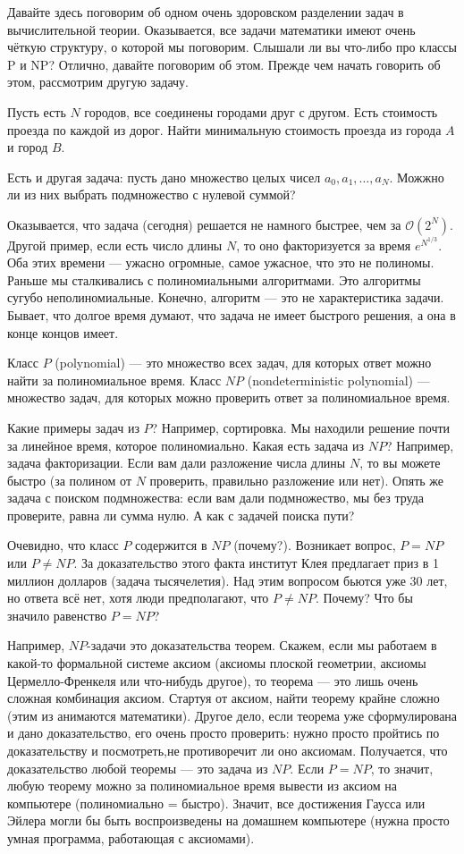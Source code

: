 \documentclass[12pt]{article}
\begin{document}
Давайте здесь поговорим об одном очень здоровском разделении задач в вычислительной теории. Оказывается, все задачи математики имеют очень чёткую структуру, о которой мы поговорим. Слышали ли вы что-либо про классы P и NP? Отлично, давайте поговорим об этом. Прежде чем начать говорить об этом, рассмотрим другую задачу.

Пусть есть $N$ городов, все соединены городами друг с другом. Есть стоимость проезда по каждой из дорог. Найти минимальную стоимость проезда из города $A$ и город $B$.

Есть и другая задача: пусть дано множество целых чисел $a_0, a_1, \ldots, a_N$. Можжно ли из них выбрать подмножество с нулевой суммой?

Оказывается, что задача (сегодня) решается не намного быстрее, чем за $\mathcal{O}(2^N)$. Другой пример, если есть число длины $N$, то оно факторизуется за время $e^{N^{1/3}}$. Оба этих времени --- ужасно огромные, самое ужасное, что это не полиномы. Раньше мы сталкивались с полиномиальными алгоритмами. Это алгоритмы сугубо неполиномиальные. Конечно, алгоритм --- это не характеристика задачи. Бывает, что долгое время думают, что задача не имеет быстрого решения, а она в конце концов имеет.

Класс $P$ (polynomial) --- это множество всех задач, для которых ответ можно найти за полиномиальное время. Класс $NP$ (nondeterministic polynomial) --- множество задач, для которых можно проверить ответ за полиномиальное время. 

Какие примеры задач из $P$? Например, сортировка. Мы находили решение почти за линейное время, которое полиномиально. Какая есть задача из $NP$? Например, задача факторизации. Если вам дали разложение числа длины $N$, то вы можете быстро (за полином от $N$ проверить, правильно разложение или нет). Опять же задача с поиском подмножества: если вам дали подмножество, мы без труда проверите, равна ли сумма нулю. А как с задачей поиска пути?

Очевидно, что класс $P$ содержится в $NP$ (почему?). Возникает вопрос, $P = NP$ или $P \neq NP$. За доказательство этого факта институт Клея предлагает приз в 1 миллион долларов (задача тысячелетия). Над этим вопросом бьются уже 30 лет, но ответа всё нет, хотя люди предполагают, что $P \neq NP$. Почему? Что бы значило равенство $P = NP$? 

Например, $NP$-задачи это доказательства теорем. Скажем, если мы работаем в какой-то формальной системе аксиом (аксиомы плоской геометрии, аксиомы Цермелло-Френкеля или что-нибудь другое), то теорема --- это лишь очень сложная комбинация аксиом. Стартуя от аксиом, найти теорему крайне сложно (этим из анимаются математики). Другое дело, если теорема уже сформулирована и дано доказательство, его очень просто проверить: нужно просто пройтись по доказательству и посмотреть,не противоречит ли оно аксиомам. Получается, что доказательство любой теоремы --- это задача из $NP$. Если $P = NP$, то значит, любую теорему можно за полиномиальное время вывести из аксиом на компьютере (полиномиально = быстро). Значит, все достижения Гаусса или Эйлера могли бы быть воспроизведены на домашнем компьютере (нужна просто умная программа, работающая с аксиомами).
\end{document}
